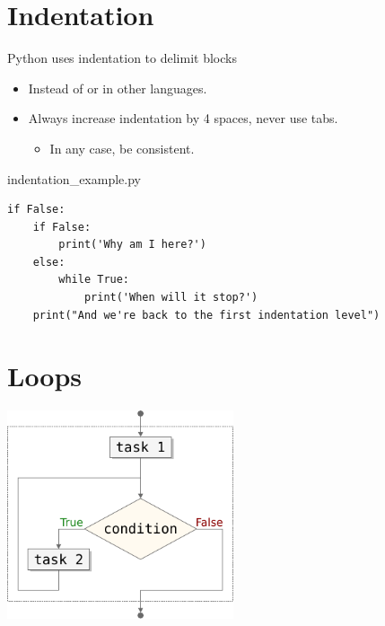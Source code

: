 \documentclass[aspectratio=1610,t]{beamer}
\begin{document}
\section{Indentation}
\begin{pframe}
 Python uses indentation to delimit blocks
 \begin{itemize}
   \item Instead of  or  in other languages.
   \item Always increase indentation by 4 spaces, never use tabs.
   \begin{itemize}
     \item In any case, be consistent.
   \end{itemize}
 \end{itemize}
 \begin{pythonfile}{indentation\_example.py}
  \begin{verbatim}
if False:
    if False:
        print('Why am I here?')
    else:
        while True:
            print('When will it stop?')
    print("And we're back to the first indentation level")
  \end{verbatim}
 \end{pythonfile}
\end{pframe}



\section{Loops}
\begin{pframe}
 \begin{center}
   \includegraphics[width=0.50\textwidth]{../../images/flow_loops.pdf}
 \end{center}
\end{pframe}
\end{document}
